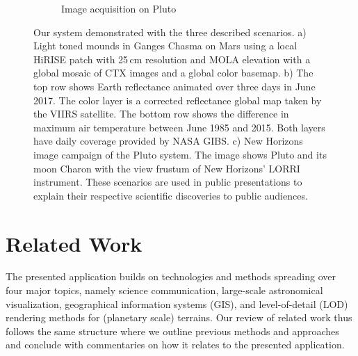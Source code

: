\documentclass[journal]{vgtc}                %
\newcommand{\plgrem}[1]{\textcolor{blue}{~\textbf{!!}~}}
\begin{document}
\begin{figure}
\begin{subfigure}[t]{0.33\linewidth}
      \caption{Image acquisition on Pluto}
    \end{subfigure}
    \caption{Our system demonstrated with the three described scenarios. a) Light toned mounds in Ganges Chasma on Mars using a local HiRISE patch with 25\,cm resolution and MOLA elevation with a global mosaic of CTX images and a global color basemap. b) The top row shows Earth reflectance animated over three days in June 2017. The color layer is a corrected reflectance global map taken by the VIIRS satellite. The bottom row shows the difference in maximum air temperature between June 1985 and 2015. Both layers have daily coverage provided by NASA GIBS. c) New Horizons image campaign of the Pluto system. The image shows Pluto and its moon Charon with the view frustum of New Horizons' LORRI instrument. These scenarios are used in public presentations to explain their respective scientific discoveries to public audiences.}\vspace{-3mm}
    \label{fig:scenarios}
\end{figure}


\section{Related Work} \label{sec:relatedwork}

%

The presented application builds on technologies and methods spreading over four major topics, namely science communication, large-scale astronomical visualization, geographical information systems (GIS), and level-of-detail (LOD) rendering methods for (planetary scale) terrains. Our review of related work thus follows the same structure where we outline previous methods and approaches and conclude with commentaries on how it relates to the presented application.
\end{document}
